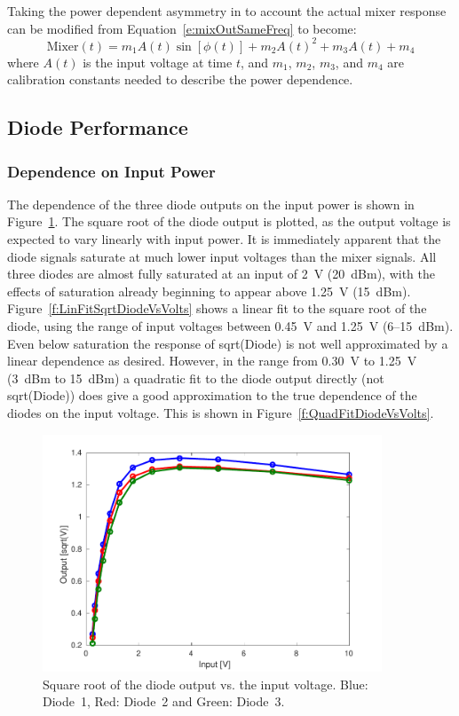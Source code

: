 Taking the power dependent asymmetry in to account the actual mixer response can be modified from Equation~\ref{e:mixOutSameFreq} to become:
\begin{equation}
\mathrm{Mixer}(t) = m_1A(t)\sin[\phi(t)] + m_2A(t)^2 + m_3A(t) + m_4
\label{e:actualMixerResponse}
\end{equation}
where \(A(t)\) is the input voltage at time \(t\), and \(m_1\), \(m_2\), \(m_3\), and \(m_4\) are calibration constants needed to describe the power dependence.

\subsection{Diode Performance}
\label{ss:sigGenDiode}

\subsubsection{Dependence on Input Power}

The dependence of the three diode outputs on the input power is shown in Figure~\ref{f:SqrtDiodeVsVolts}. The square root of the diode output is plotted, as the output voltage is expected to vary linearly with input power. It is immediately apparent that the diode signals saturate at much lower input voltages than the mixer signals. All three diodes are almost fully saturated at an input of 2~V (20~dBm), with the effects of saturation already beginning to appear above 1.25~V (15~dBm). Figure~\ref{f:LinFitSqrtDiodeVsVolts} shows a linear fit to the square root of the diode, using the range of input voltages between 0.45~V and 1.25~V (6--15~dBm). Even below saturation the response of sqrt(Diode) is not well approximated by a linear dependence as desired. However, in the range from 0.30~V to 1.25~V (3~dBm to 15~dBm) a quadratic fit to the diode output directly (not sqrt(Diode)) does give a good approximation to the true dependence of the diodes on the input voltage. This is shown in Figure~\ref{f:QuadFitDiodeVsVolts}.

\begin{figure}
  \centering
  \includegraphics[width=0.9\textwidth]{Figures/phaseMons/SqrtDiodeVsVolts}
  \caption{Square root of the diode output vs. the input voltage. Blue: Diode~1, Red: Diode~2 and Green: Diode~3.}
  \label{f:SqrtDiodeVsVolts}
\end{figure}


